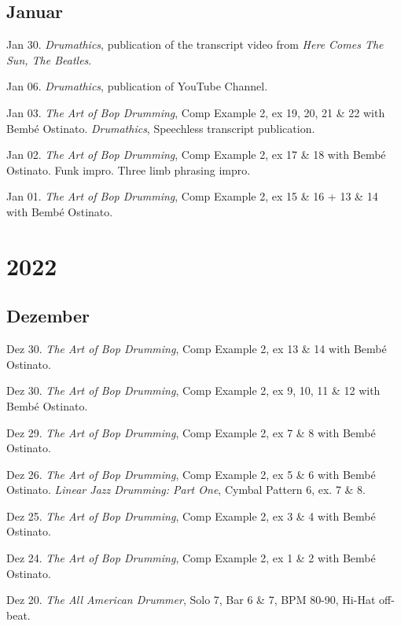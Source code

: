 \documentclass[
]{book}
\begin{document}
\hypertarget{januar-2023}{%
\subsection*{Januar}\label{januar-2023}}

Jan 30. \emph{Drumathics}, publication of the transcript video from \emph{Here Comes The Sun, The Beatles}.

Jan 06. \emph{Drumathics}, publication of YouTube Channel.

Jan 03. \emph{The Art of Bop Drumming}, Comp Example 2, ex 19, 20, 21 \& 22 with Bembé Ostinato. \emph{Drumathics}, Speechless transcript publication.

Jan 02. \emph{The Art of Bop Drumming}, Comp Example 2, ex 17 \& 18 with Bembé Ostinato. Funk impro. Three limb phrasing impro.

Jan 01. \emph{The Art of Bop Drumming}, Comp Example 2, ex 15 \& 16 + 13 \& 14 with Bembé Ostinato.

\hypertarget{diary-2022}{%
\section*{2022}\label{diary-2022}}

\hypertarget{dezember-2022}{%
\subsection*{Dezember}\label{dezember-2022}}

Dez 30. \emph{The Art of Bop Drumming}, Comp Example 2, ex 13 \& 14 with Bembé Ostinato.

Dez 30. \emph{The Art of Bop Drumming}, Comp Example 2, ex 9, 10, 11 \& 12 with Bembé Ostinato.

Dez 29. \emph{The Art of Bop Drumming}, Comp Example 2, ex 7 \& 8 with Bembé Ostinato.

Dez 26. \emph{The Art of Bop Drumming}, Comp Example 2, ex 5 \& 6 with Bembé Ostinato. \emph{Linear Jazz Drumming: Part One}, Cymbal Pattern 6, ex. 7 \& 8.

Dez 25. \emph{The Art of Bop Drumming}, Comp Example 2, ex 3 \& 4 with Bembé Ostinato.

Dez 24. \emph{The Art of Bop Drumming}, Comp Example 2, ex 1 \& 2 with Bembé Ostinato.

Dez 20. \emph{The All American Drummer}, Solo 7, Bar 6 \& 7, BPM 80-90, Hi-Hat off-beat.
\end{document}
